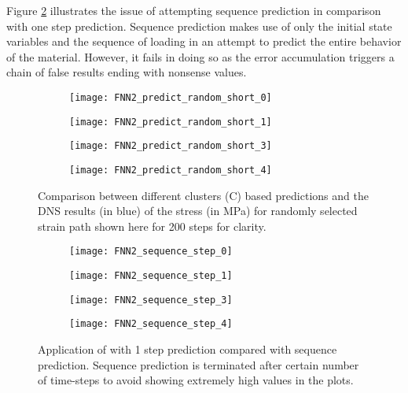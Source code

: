 Figure \ref{fig-nn-rnn4-1} illustrates the issue of attempting sequence prediction in comparison with one step prediction. Sequence prediction makes use of only the initial state variables and the sequence of loading in an attempt to predict the entire behavior of the material. However, it fails in doing so as the error accumulation triggers a chain of false results ending with nonsense values.

\begin{figure}
	\centering
	\begin{subfigure}[t]{0.45\textwidth}
		\texttt{[image: FNN2\_predict\_random\_short\_0]}
	\end{subfigure}
	\begin{subfigure}[t]{0.45\textwidth}
		\texttt{[image: FNN2\_predict\_random\_short\_1]}
	\end{subfigure}
	\begin{subfigure}[t]{0.45\textwidth}
		\texttt{[image: FNN2\_predict\_random\_short\_3]}
	\end{subfigure}
	\begin{subfigure}[t]{0.45\textwidth}
		\texttt{[image: FNN2\_predict\_random\_short\_4]}
	\end{subfigure}
	\caption{Comparison between different clusters (C) based \fnn predictions and the DNS results (in blue) of the stress (in MPa) for randomly selected strain path shown here for 200 steps for clarity.}\label{fig-nn-rnn4}
\end{figure}

\begin{figure}
	\centering
	\begin{subfigure}[t]{0.45\textwidth}
		\texttt{[image: FNN2\_sequence\_step\_0]}
	\end{subfigure}
	\begin{subfigure}[t]{0.45\textwidth}
		\texttt{[image: FNN2\_sequence\_step\_1]}
	\end{subfigure}
	\begin{subfigure}[t]{0.45\textwidth}
		\texttt{[image: FNN2\_sequence\_step\_3]}
	\end{subfigure}
	\begin{subfigure}[t]{0.45\textwidth}
		\texttt{[image: FNN2\_sequence\_step\_4]}
	\end{subfigure}
	\caption{Application of \fnn with 1 step prediction compared with sequence prediction. Sequence prediction is terminated after certain number of time-steps to avoid showing extremely high values in the plots.}\label{fig-nn-rnn4-1}
\end{figure}

